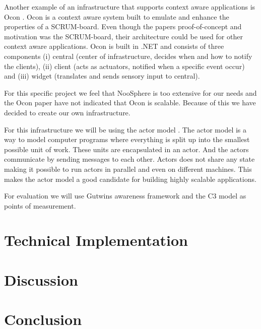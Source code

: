 \documentclass{sigchi}
\begin{document}
Another example of an infrastructure that supports context aware applications is Ocon \cite{ocon}.
Ocon is a context aware system built to emulate and enhance the properties of a SCRUM-board.
Even though the papers proof-of-concept and motivation was the SCRUM-board, their architecture could be used for other context aware applications.
Ocon is built in .NET and consists of three components (i) central (center of infrastructure, decides when and how to notify the clients), (ii) client (acts as actuators, notified when a specific event occur) and (iii) widget (translates and sends sensory input to central).

For this specific project we feel that NooSphere is too extensive for our needs and the Ocon paper have not indicated that Ocon is scalable.
Because of this we have decided to create our own infrastructure.

For this infrastructure we will be using the actor model \cite{hewitt1973universal}.
The actor model is a way to model computer programs where everything is split up into the smallest possible unit of work.
These units are encapsulated in an actor.
And the actors communicate by sending messages to each other.
Actors does not share any state making it possible to run actors in parallel and even on different machines.
This makes the actor model a good candidate for building highly scalable applications.

For evaluation we will use Gutwins awareness framework and the C3 model as points of measurement.

\section{Technical Implementation}


\section{Discussion}

\section{Conclusion}

\balance



\end{document}
